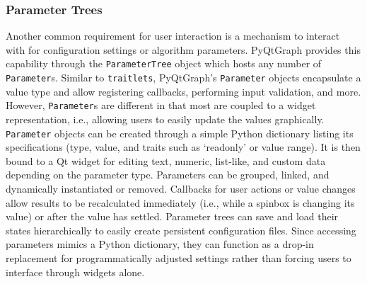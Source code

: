 \subsubsection{Parameter Trees}\label{sec:paramtrees}
Another common requirement for user interaction is a mechanism to interact with for configuration settings or algorithm parameters. PyQtGraph provides this capability through the \texttt{ParameterTree} object which hosts any number of \texttt{Parameter}s. Similar to \texttt{traitlets}, PyQtGraph's \texttt{Parameter} objects encapsulate a value type and allow registering callbacks, performing input validation, and more. However, \texttt{Parameter}s are different in that most are coupled to a widget representation, i.e., allowing users to easily update the values graphically.
\texttt{Parameter} objects can be created through a simple Python dictionary listing its specifications (type, value, and traits such as `readonly' or value range). It is then bound to a Qt widget for editing text, numeric, list-like, and custom data depending on the parameter type. Parameters can be grouped, linked, and dynamically instantiated or removed. Callbacks for user actions or value changes allow results to be recalculated immediately (i.e., while a spinbox is changing its value) or after the value has settled. Parameter trees can save and load their states hierarchically to easily create persistent configuration files. Since accessing parameters mimics a Python dictionary, they can function as a drop-in replacement for programmatically adjusted settings rather than forcing users to interface through widgets alone.




